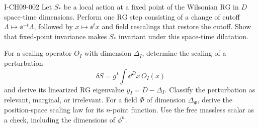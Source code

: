 \begin{exercise}{I-CH09-002}
Let $S_*$ be a local action at a fixed point of the Wilsonian RG in $D$
space-time dimensions.  Perform one RG step consisting of a change of cutoff
$\Lambda\mapsto\ee^{-t}\Lambda$, followed by $x\mapsto\ee^t x$ and field
rescalings that restore the cutoff.  Show that fixed-point invariance makes
$S_*$ invariant under this space-time dilatation.

For a scaling operator $O_I$ with dimension $\Delta_I$, determine the scaling
of a perturbation
\[
  \delta S=g^I\int\dd^D x\,O_I(x)
\]
and derive its linearized RG eigenvalue $y_I=D-\Delta_I$.  Classify the
perturbation as relevant, marginal, or irrelevant.  For a field $\Phi$ of
dimension $\Delta_\Phi$, derive the position-space scaling law for its
$n$-point function.  Use the free massless scalar as a check, including the
dimensions of $\phi^n$.
\end{exercise}
